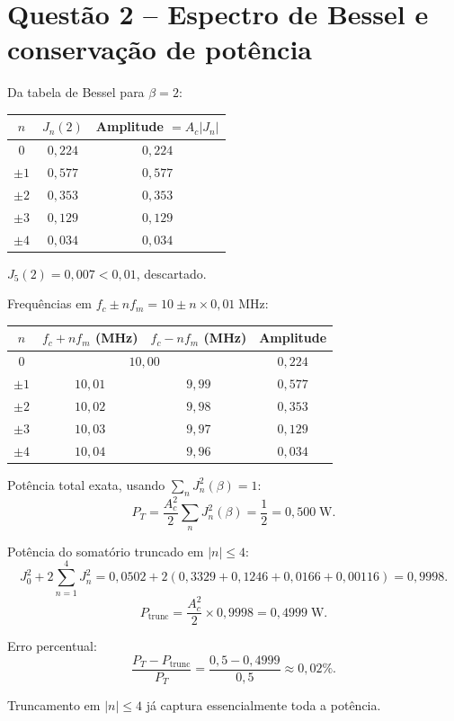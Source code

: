 \documentclass[11pt,a4paper]{article}
\begin{document}
\section*{Questão 2 -- Espectro de Bessel e conservação de potência}

\begin{resolucao}[Item a -- Componentes espectrais para $\beta = 2$]

Da tabela de Bessel para $\beta = 2$:
\begin{center}
\begin{tabular}{ccc}
\toprule
$n$ & $J_n(2)$ & Amplitude $= A_c|J_n|$ \\
\midrule
$0$ & $0{,}224$ & $0{,}224$ \\
$\pm 1$ & $0{,}577$ & $0{,}577$ \\
$\pm 2$ & $0{,}353$ & $0{,}353$ \\
$\pm 3$ & $0{,}129$ & $0{,}129$ \\
$\pm 4$ & $0{,}034$ & $0{,}034$ \\
\bottomrule
\end{tabular}
\end{center}

$J_5(2) = 0{,}007 < 0{,}01$, descartado.

Frequências em $f_c \pm n f_m = 10 \pm n \times 0{,}01\;\text{MHz}$:

\begin{center}
\begin{tabular}{cccc}
\toprule
$n$ & $f_c + n f_m$ (MHz) & $f_c - n f_m$ (MHz) & Amplitude \\
\midrule
$0$ & \multicolumn{2}{c}{$10{,}00$} & $0{,}224$ \\
$\pm 1$ & $10{,}01$ & $9{,}99$ & $0{,}577$ \\
$\pm 2$ & $10{,}02$ & $9{,}98$ & $0{,}353$ \\
$\pm 3$ & $10{,}03$ & $9{,}97$ & $0{,}129$ \\
$\pm 4$ & $10{,}04$ & $9{,}96$ & $0{,}034$ \\
\bottomrule
\end{tabular}
\end{center}
\end{resolucao}

\begin{resolucao}

Potência total exata, usando $\sum_n J_n^2(\beta) = 1$:
\[
  P_T = \frac{A_c^2}{2}\sum_{n}J_n^2(\beta) = \frac{1}{2} = 0{,}500\;\text{W}.
\]

Potência do somatório truncado em $|n| \le 4$:
\[
  J_0^2 + 2\sum_{n=1}^{4} J_n^2 = 0{,}0502 + 2(0{,}3329 + 0{,}1246 + 0{,}0166 + 0{,}00116) = 0{,}9998.
\]
\[
  P_{\text{trunc}} = \frac{A_c^2}{2} \times 0{,}9998 = 0{,}4999\;\text{W}.
\]

Erro percentual:
\[
  \frac{P_T - P_{\text{trunc}}}{P_T} = \frac{0{,}5 - 0{,}4999}{0{,}5} \approx 0{,}02\%.
\]

Truncamento em $|n| \le 4$ já captura essencialmente toda a potência.
\end{resolucao}
\end{document}
